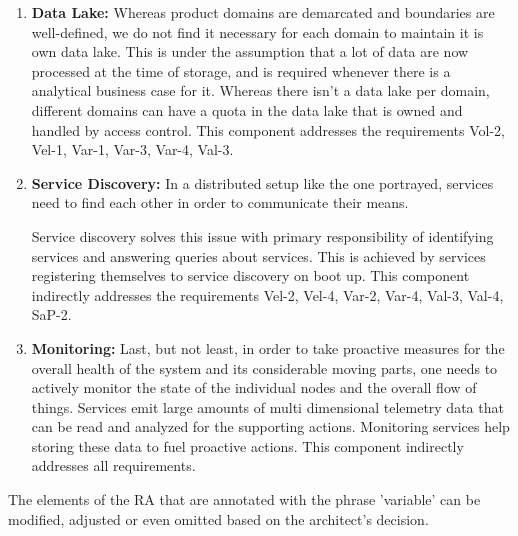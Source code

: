 \documentclass[conference]{IEEEtran}
\begin{document}
\begin{enumerate}
    \item \textbf{Data Lake:} Whereas product domains are demarcated and boundaries are well-defined, we do not find it necessary for each domain to maintain it is own data lake. This is under the assumption that a lot of data are now processed at the time of storage, and is required whenever there is a analytical business case for it. Whereas there isn't a data lake per domain, different domains can have a quota in the data lake that is owned and handled by access control. This component addresses the requirements Vol-2, Vel-1, Var-1, Var-3, Var-4, Val-3.
    
    \item \textbf{Service Discovery:} In a distributed setup like the one portrayed, services need to find each other in order to communicate their means. 
    
    
     Service discovery solves this issue with primary responsibility of identifying services and answering queries about services. This is achieved by services registering themselves to service discovery on boot up. This component indirectly addresses the requirements Vel-2, Vel-4, Var-2, Var-4, Val-3, Val-4, SaP-2. 

    \item \textbf{Monitoring:} Last, but not least, in order to take proactive measures for the overall health of the system and its considerable moving parts, one needs to actively monitor the state of the individual nodes and the overall flow of things. Services emit large amounts of multi dimensional telemetry data that can be read and analyzed for the supporting actions. Monitoring services help storing these data to fuel proactive actions. This component indirectly addresses all requirements. 

\end{enumerate}

The elements of the RA that are annotated with the phrase 'variable' can be modified, adjusted or even omitted based on the architect's decision. 

\end{document}
